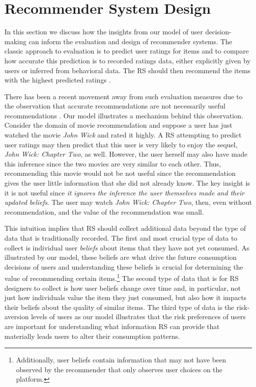 \documentclass{article}
\begin{document}
\section{Recommender System Design}
In this section we discuss how the insights from our model of user decision-making can inform the evaluation and design of recommender systems. The classic approach to evaluation is to predict user ratings for items and to compare how accurate this prediction is to recorded ratings data, either explicitly given by users or inferred from behavioral data. The RS should then recommend the items with the highest predicted ratings \cite{adomavicius2005toward}.
\par
There has been a recent movement away from such evaluation measures due to the observation that accurate recommendations are not necessarily useful recommendations \cite{mcnee2006being}. Our model illustrates a mechanism behind this observation. Consider the domain of movie recommendation and suppose a user has just watched the movie \textit{John Wick} and rated it highly. A RS attempting to predict user ratings may then predict that this user is very likely to enjoy the sequel, \textit{John Wick: Chapter Two}, as well. However, the user herself may also have made this inference since the two movies are very similar to each other. Thus, recommending this movie would not be not useful since the recommendation gives the user little information that she did not already know. The key insight is it is not useful since \textit{it ignores the inference the user themselves made and their updated beliefs}. The user may watch \textit{John Wick: Chapter Two}, then, even without recommendation, and the value of the recommendation was small.
\par
This intuition implies that RS should collect additional data beyond the type of data that is traditionally recorded. The first and most crucial type of data to collect is individual user \textit{beliefs} about items that they have not yet consumed. As illustrated by our model, these beliefs are what drive the future consumption decisions of users and understanding these beliefs is crucial for determining the value of recommending certain items.\footnote{Additionally, user beliefs contain information that may not have been observed by the recommender that only observes user choices on the platform.} The second type of data that is  for RS designers to collect is how user beliefs change over time and, in particular, not just how individuals value the item they just consumed, but also how it impacts their beliefs about the quality of similar items. The third type of data is the risk-aversion levels of users as our model illustrates that the risk preferences of users are important for understanding what information RS can provide that materially leads users to alter their consumption patterns.
\end{document}

